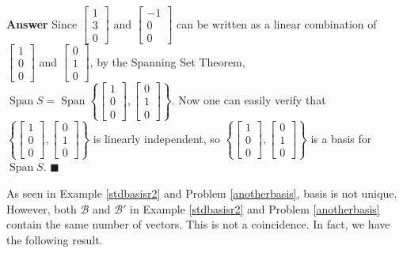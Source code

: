 \documentclass[12pt,letterpaper]{book}
\numberwithin{equation}{section}
\theoremstyle{definition}
\newenvironment{answer}{\noindent\textbf{Answer}}{\hfill$\blacksquare$\vspace{0.1in}}
\newcommand{\Span}{\operatorname{Span}}
\begin{document}
\begin{answer}
Since $\left[\begin{array}{r} 1 \\ 3 \\ 0
\end{array}\right]$ and $\left[\begin{array}{r} -1 \\ 0 \\ 0
\end{array}\right]$ can be written as a linear combination of $\left[\begin{array}{r} 1 \\ 0 \\ 0
\end{array}\right]$ and $\left[\begin{array}{r} 0 \\ 1 \\ 0
\end{array}\right]$, by the Spanning Set Theorem, $\Span S=\Span \left\{\left[\begin{array}{r} 1 \\ 0 \\ 0
\end{array}\right],\left[\begin{array}{r} 0 \\ 1 \\ 0
\end{array}\right]\right\}$. Now one can easily verify that $\left\{\left[\begin{array}{r} 1 \\ 0 \\ 0
\end{array}\right],\left[\begin{array}{r} 0 \\ 1 \\ 0
\end{array}\right]\right\}$ is linearly independent, so $\left\{\left[\begin{array}{r} 1 \\ 0 \\ 0
\end{array}\right],\left[\begin{array}{r} 0 \\ 1 \\ 0
\end{array}\right]\right\}$ is a basis for $\Span S$.
\end{answer}

As seen in Example \ref{stdbasisr2} and Problem \ref{anotherbasis}, basis is not unique. However, both $\mathscr{B}$ and $\mathscr{B}'$  in Example \ref{stdbasisr2} and Problem \ref{anotherbasis} contain the same number of vectors. This is not a coincidence. In fact, we have the following result.
\end{document}
